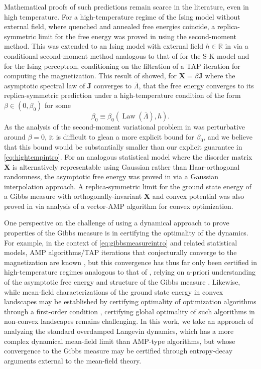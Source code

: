 \documentclass[11pt,letterpaper,reqno]{amsart}
\def\R{\mathbb{R}}
\def\X{\mathbf{X}}
\def\J{\mathbf{J}}
\def\Law{\operatorname{Law}}
\theoremstyle{definition}
\numberwithin{equation}{section}
\begin{document}
Mathematical proofs of such predictions remain scarce in the
literature, even in high temperature. For a
high-temperature regime of the Ising model without external field, where
quenched and annealed free energies coincide, a replica-symmetric limit for the free
energy was proved in \cite{bhattacharya2016high} using the second-moment method. This was extended to an Ising
model with external field $h \in \R$ in \cite{fan2024replica} via a conditional
second-moment method analogous to that of \cite{bolthausen2018morita} for the S-K model and
\cite{ding2019capacity} for the Ising perceptron, conditioning on the filtration of a
TAP iteration for computing the magnetization. This result of
\cite{fan2024replica}
showed, for $\X=\beta\J$ where the asymptotic spectral law of $\J$ converges to
$\bar \Lambda$, that the free energy converges to its replica-symmetric prediction
under a high-temperature condition of the form
$\beta \in (0,\beta_0)$ for some
\[\beta_0 \equiv \beta_0(\Law(\bar\Lambda),h).\]
As the analysis of the second-moment variational problem in \cite{fan2024replica} was
perturbative around $\beta=0$, it is difficult to glean a more explicit bound for
$\beta_0$, and we believe that this bound would be substantially smaller than
our explicit guarantee in \eqref{eq:hightempintro}. For an analogous statistical
model where
the disorder matrix $\X$ is alternatively representable using Gaussian rather than
Haar-orthogonal randomness, the asymptotic free energy was proved in
\cite{barbier2018mutual} via a Gaussian interpolation approach. A
replica-symmetric limit for the ground state energy of a Gibbs measure with
orthogonally-invariant $\X$ and convex
potential was also proved in \cite{gerbelot2022asymptotic}
via analysis of a vector-AMP algorithm for convex optimization.

One perspective on the challenge of using a dynamical approach to prove
properties of the Gibbs measure is in certifying the optimality of the dynamics.
For example, in the
context of \eqref{eq:gibbsmeasureintro} and related statistical models,
AMP algorithms/TAP iterations that conjecturally converge to the magnetization
are known \cite{opper2016theory,rangan2019vector,ccakmak2019memory}, but this convergence has thus far only been
certified in high-temperature regimes analogous to that of
\cite{fan2024replica}, relying on a-priori understanding of the asymptotic free
energy and structure of the Gibbs measure \cite{fan2022tap,li2023random}.
Likewise, while mean-field characterizations
of the ground state energy in convex landscapes may be established
by certifying optimality of optimization algorithms through a
first-order condition \cite{bayati2011lasso,donoho2016high,gerbelot2022asymptotic}, certifying global optimality of
such algorithms in non-convex landscapes remains challenging. In this work, we
take an approach of analyzing the standard overdamped Langevin dynamics, which
has a more complex dynamical mean-field limit than AMP-type algorithms, but
whose convergence to the Gibbs measure may be certified through
entropy-decay arguments external to the mean-field theory.
\end{document}

